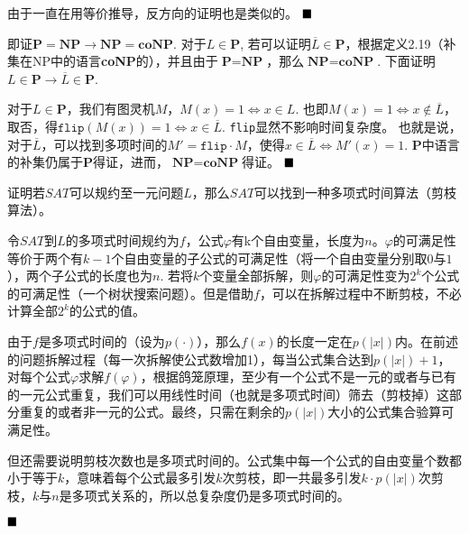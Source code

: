 \documentclass[11pt,largemargins]{homework}
\renewcommand{\qed}{$\hfill\blacksquare$}
\begin{document}
由于一直在用等价推导，反方向的证明也是类似的。
\qed

即证$\textbf{P} = \textbf{NP}\rightarrow \textbf{NP}=\textbf{coNP}$.
对于$L \in \textbf{P}$, 若可以证明$\overline{L} \in \textbf{P}$，根据定义2.19（补集在NP中的语言\textbf{coNP}的），并且由于$\textbf{P} = \textbf{NP}$，那么$\textbf{NP} = \textbf{coNP}$. 下面证明$L\in \textbf{P}\rightarrow \overline{L}\in \textbf{P}$.

对于$L \in \textbf{P}$，我们有图灵机$M$，$M(x) = 1\Leftrightarrow x\in L$.
也即$M(x) = 1\Leftrightarrow x\not\in \overline{L}$，
取否，得$\texttt{flip}(M(x)) = 1 \Leftrightarrow x\in\overline{L}$. \texttt{flip}显然不影响时间复杂度。
也就是说，对于$\overline{L}$，可以找到多项时间的$M' = \texttt{flip}\cdot M$，使得$x\in\overline{L}\Leftrightarrow M'(x)=1$. \textbf{P}中语言的补集仍属于\textbf{P}得证，进而，$\textbf{NP}=\textbf{coNP}$得证。
\qed

证明若$SAT$可以规约至一元问题$L$，那么$SAT$可以找到一种多项式时间算法（剪枝算法）。

令$SAT$到$L$的多项式时间规约为$f$，公式$\varphi$有k个自由变量，长度为$n$。$\varphi$的可满足性等价于两个有$k-1$个自由变量的子公式的可满足性（将一个自由变量分别取$0$与$1$），两个子公式的长度也为$n$. 若将$k$个变量全部拆解，则$\varphi$的可满足性变为$2^k$个公式的可满足性（一个树状搜索问题）。但是借助$f$，可以在拆解过程中不断剪枝，不必计算全部$2^k$的公式的值。

由于$f$是多项式时间的（设为$p(\cdot)$），那么$f(x)$的长度一定在$p(|x|)$内。在前述的问题拆解过程（每一次拆解使公式数增加1），每当公式集合达到$p(|x|)+1$，对每个公式$\varphi$求解$f(\varphi)$，根据鸽笼原理，至少有一个公式不是一元的或者与已有的一元公式重复，我们可以用线性时间（也就是多项式时间）筛去（剪枝掉）这部分重复的或者非一元的公式。最终，只需在剩余的$p(|x|)$大小的公式集合验算可满足性。

但还需要说明剪枝次数也是多项式时间的。公式集中每一个公式的自由变量个数都小于等于$k$，意味着每个公式最多引发$k$次剪枝，即一共最多引发$k\cdot p(|x|)$次剪枝，$k$与$n$是多项式关系的，所以总复杂度仍是多项式时间的。

\qed
\end{document}
